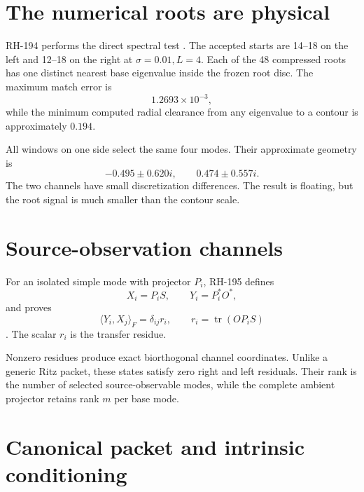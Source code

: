 \documentclass[12pt]{article}
\theoremstyle{remark}
\begin{document}
\section{The numerical roots are physical}

RH-194 performs the direct spectral test \citep{WangRH194}.  The accepted
starts are 14--18 on the left and 12--18 on the right at
$\sigma=0.01,L=4$.  Each of the 48 compressed roots has one distinct nearest
base eigenvalue inside the frozen root disc.  The maximum match error is
\begin{equation}\label{eq:match}
 1.2693\times10^{-3},
\end{equation}
while the minimum computed radial clearance from any eigenvalue to a contour
is approximately $0.194$.

All windows on one side select the same four modes.  Their approximate
geometry is
\begin{equation}\label{eq:quartet}
 -0.495\pm0.620i,
 \qquad
 0.474\pm0.557i.
\end{equation}
The two channels have small discretization differences.  The result is
floating, but the root signal is much smaller than the contour scale.

\section{Source-observation channels}

For an isolated simple mode with projector $P_i$, RH-195 defines
\begin{equation}\label{eq:channel-states}
 X_i=P_iS,
 \qquad Y_i=P_i^*O^*,
\end{equation}
and proves
\begin{equation}\label{eq:residue-pairing}
 \langle Y_i,X_j\rangle_F
 =\delta_{ij}r_i,
 \qquad
 r_i=\operatorname{tr}(OP_iS)
\end{equation}
\citep{WangRH195}.  The scalar $r_i$ is the transfer residue.

Nonzero residues produce exact biorthogonal channel coordinates.  Unlike a
generic Ritz packet, these states satisfy zero right and left residuals.
Their rank is the number of selected source-observable modes, while the
complete ambient projector retains rank $m$ per base mode.

\section{Canonical packet and intrinsic conditioning}
\end{document}
